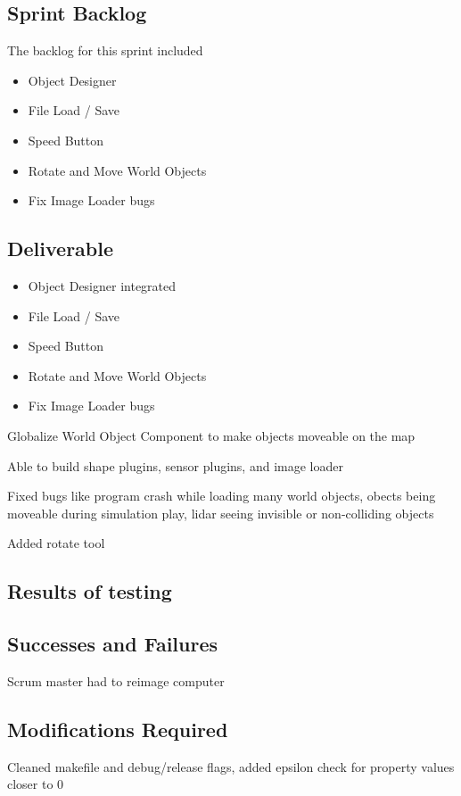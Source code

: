 \subsection{Sprint Backlog}

The backlog for this sprint included

\begin{itemize}
	\item Object Designer
	\item File Load / Save	
	\item Speed Button
	\item Rotate and Move World Objects
	\item Fix Image Loader bugs
\end{itemize}

\subsection{Deliverable}

\begin{itemize}
	\item Object Designer integrated
	\item File Load / Save	
	\item Speed Button
	\item Rotate and Move World Objects
	\item Fix Image Loader bugs
\end{itemize}

Globalize World Object Component to make objects moveable on the map

Able to build shape plugins, sensor plugins, and image loader

Fixed bugs like program crash while loading many world objects, obects being moveable during simulation play, lidar seeing invisible or non-colliding objects

Added rotate tool

\subsection{Results of testing}


\subsection{Successes and Failures}

Scrum master had to reimage computer

\subsection{Modifications Required}
Cleaned makefile and debug/release flags, added epsilon check for property values closer to 0

